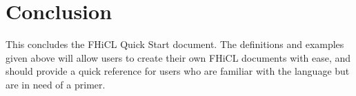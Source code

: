 \documentclass{memarticle}
\newcommand{\fhicl}%
 {FHiCL\xspace}
\begin{document}



\chapter{Conclusion}
        This concludes the \fhicl Quick Start document.
        The definitions and examples given above will allow users to create their own \fhicl documents with ease,
        and should provide a quick reference for users who are familiar with the language but are in need of a primer.
\end{document}
